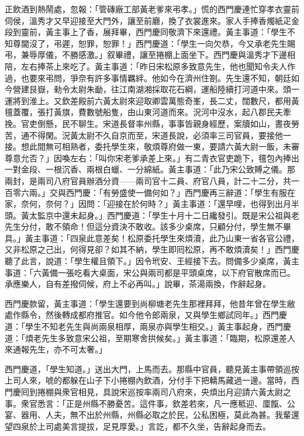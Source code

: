 正飲酒到熱鬧處，忽報：「管磚廠工部黃老爹來弔孝。」慌的西門慶連忙穿孝衣靈前伺侯，溫秀才又早迎接至大門外，讓至前廳，換了衣裳進來。家人手捧香燭紙疋金段到靈前，黃主事上了香，展拜畢，西門慶同敬濟下來還禮。黃主事道：「學生不知尊閫沒了，弔遲，恕罪，恕罪！」西門慶道：「學生一向欠恭，今又承老先生賜弔，兼辱厚儀，不勝感激。」叙畢禮，讓至捲棚上面坐下。西門慶與溫秀才下邊相陪，左右捧茶上來吃了。黃主事道：「昨日宋松原多致意先生，他也聞知令夫人作過，也要來弔問，爭奈有許多事情羈絆。他如今在濟州住劄。先生還不知，朝廷如今營建艮嶽，勑令太尉朱勔，往江南湖湘採取花石綱，運船陸續打河道中來。頭一運將到淮上。又欽差殿前六黃太尉來迎取卿雲萬態奇峯，長二丈，闊數尺，都用黃氊蓋覆，張打黃旗，費數號船隻，由山東河道而來。況河中沒水，起八郡民夫牽挽。官吏倒懸，民不聊生。{}宋道長督率州縣，事事皆親身經歷，案牘如山，晝夜勞苦，通不得閑。況黃太尉不久自京而至，宋道長說，必須率三司官員，要接他一接。想此間無可相熟者，委托學生來，敬煩尊府做一東，要請六黃大尉一飯，未審尊意允否？」因喚左右：「叫你宋老爹承差上來。」有二青衣官吏跪下，氊包內捧出一對金段、一根沉香、兩根白蠟、一分綿紙。黃主事道：「此乃宋公致賻之儀。那兩封，是兩司八府官員辦酒分資——兩司官十二員、府官八員，計二十二分，共一百零六兩。」交與西門慶：「有勞盛使一備何如？」西門慶再三辭道：「學生有服在家，奈何，奈何？」因問：「迎接在於何時？」黃主事道：「還早哩，也得到出月半頭。黃太監京中還未起身。」西門慶道：「學生十月十二日纔發引。既是宋公祖與老先生分付，敢不領命！但這分資決不敢收。該多少桌席，只顧分付，學生無不畢具。」黃主事道：「四泉此意差矣！松原委托學生來煩瀆，此乃山東一省各官公禮，又非松原之己出，何得見卻？如其不納，學生即囘松原，再不敢煩瀆矣！」{}西門慶聽了此言，說道：「學生權且領下。」因令玳安、王經接下去。問備多少桌席，黃主事道：「六黃備一張吃看大桌面，宋公與兩司都是平頭桌席，以下府官散席而已。承應樂人，自有差撥伺候，府上不必再叫。」說畢，茶湯兩換，作辭起身。

西門慶款留，黃主事道：「學生還要到尚柳塘老先生那裡拜拜，他昔年曾在學生敝處作縣令，然後轉成都府推官。如今他令郎兩泉，又與學生鄉試同年。」{}西門慶道：「學生不知老先生與尚兩泉相厚，兩泉亦與學生相交。」黃主事起身，西門慶道：「煩老先生多致意宋公祖，至期寒舍拱候矣。」黃主事道：「臨期，松原還差人來通報先生，亦不可太奢。」

西門慶道，「學生知道。」送出大門，上馬而去。那縣中官員，聽見黃主事帶領巡按上司人來，唬的都躲在山子下小捲棚內飲酒，分付手下把轎馬藏過一邊。{}當時，西門慶囘到捲棚與衆官相見，具說宋巡按率兩司八府來，央煩出月迎請六黃太尉之事。衆官悉言：「正是州縣不勝憂苦。這件事，欽差若來，凡一應秪迎、廩餼、公宴、器用、人夫，無不出於州縣，州縣必取之於民，公私困極，莫此為甚。我輩還望四泉於上司處美言提拔，足見厚愛。」言訖，都不久坐，告辭起身而去。

